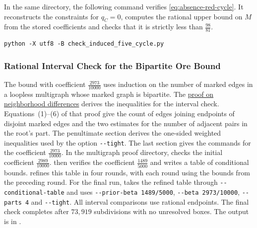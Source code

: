 In the same directory, the following command verifies
\eqref{eq:absence-red-cycle}. It reconstructs the constraints for
$q_C=0$, computes the rational upper bound on $M$ from the stored
coefficients and checks that it is strictly less than $\frac{98}{81}$.
\begin{verbatim}
python -X utf8 -B check_induced_five_cycle.py
\end{verbatim}

\subsubsection{Rational Interval Check for the Bipartite Ore Bound}
\label{app:ore-replay}

The bound with coefficient $\frac{2973}{10000}$ uses induction on the
number of marked edges in a loopless multigraph whose marked graph is
bipartite. The
\href{https://github.com/rewere143-cell/fgst-strong-clique/blob/v1.0.0/reproducibility/multigraph/\%E4\%B8\%80\%E8\%88\%AC\%E6\%97\%A0\%E7\%8E\%AF\%E5\%A4\%9A\%E9\%87\%8D\%E5\%9B\%BE\%E7\%9A\%84\%E6\%8E\%A8\%E5\%B9\%BF/\%E4\%BA\%8C\%E9\%83\%A8\%E6\%A0\%87\%E8\%AE\%B0\%E8\%A7\%81\%E8\%AF\%81\%E4\%BA\%8F\%E6\%8D\%9F\%E4\%B8\%8E\%E9\%82\%BB\%E5\%9F\%9F\%E5\%B7\%AE.md}{proof on neighborhood differences}
derives the inequalities for the interval check. Equations~(1)--(6)
of that proof give the count of edges joining endpoints of disjoint
marked edges and the two estimates for the number of adjacent pairs
in the root's part. The penultimate section derives the one-sided
weighted inequalities used by the option \verb|--tight|. The last
section gives the commands for the coefficient $\frac{2973}{10000}$.
In the
multigraph proof directory, 
checks the initial coefficient $\frac{2989}{10000}$.
 then verifies the coefficient
$\frac{1489}{5000}$ and writes a table of conditional bounds.
 refines this table in four
rounds, with each round using the bounds from the preceding round.
For the final run,  takes
the refined table through \verb|--conditional-table| and uses
\verb|--prior-beta 1489/5000|, \verb|--beta 2973/10000|,
\verb|--parts 4| and \verb|--tight|. All interval comparisons use
rational endpoints. The final check completes after $73{,}919$
subdivisions with no unresolved boxes. The output is in
.


